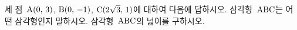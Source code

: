 세 점~$\mathrm{A}(0,\,3)$, $\mathrm{B}(0,\,-1)$, $\mathrm{C}(2\sqrt{3},\,1)$에 대하여 다음에 답하시오.
 삼각형~$\mathrm{ABC}$는 어떤 삼각형인지 말하시오.
 삼각형~$\mathrm{ABC}$의 넓이를 구하시오.
